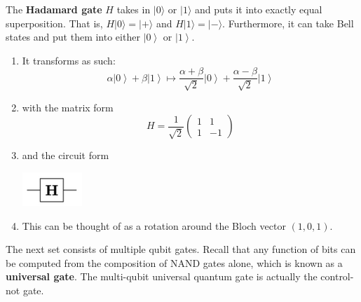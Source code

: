\documentclass{article}
\newcommand{\ket}[1]{\ensuremath{\left|#1\right\rangle}}
\begin{document}
    \begin{definition}[Hadamard]
      The \textbf{Hadamard gate} $H$ takes in $|0\rangle$ or $|1\rangle$ and puts it into exactly equal superposition. That is, $H|0\rangle = |+\rangle$ and $H|1\rangle = |-\rangle$. Furthermore, it can take Bell states and put them into either $\ket{0}$ or $\ket{1}$. 
      \begin{enumerate} 
        \item It transforms as such: 
          \begin{equation} 
            \alpha \ket{0} + \beta \ket{1} \mapsto \frac{\alpha + \beta}{\sqrt{2}} \ket{0} + \frac{\alpha - \beta}{\sqrt{2}} \ket{1}
          \end{equation}
        \item with the matrix form 
          \begin{equation} 
            H = \frac{1}{\sqrt{2}} \begin{pmatrix} 1 & 1 \\ 1 & -1 \end{pmatrix}
          \end{equation}
        \item and the circuit form 
          \begin{center}
            \includegraphics[scale=0.5]{img/Hadamard_gate.png}
          \end{center}
        \item This can be thought of as a rotation around the Bloch vector $(1, 0, 1)$.
      \end{enumerate}
    \end{definition}

    The next set consists of multiple qubit gates. Recall that any function of bits can be computed from the composition of NAND gates alone, which is known as a \textbf{universal gate}. The multi-qubit universal quantum gate is actually the control-not gate.
\end{document}
